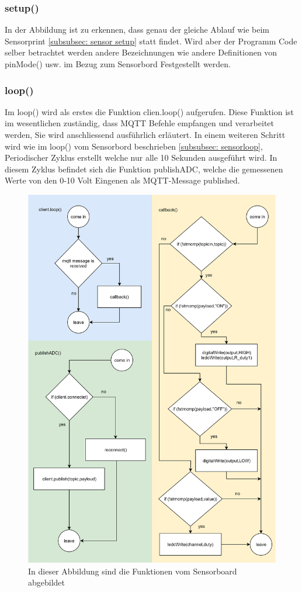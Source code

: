 \subsubsection{setup()}
In der Abbildung ist zu erkennen, dass genau der gleiche Ablauf wie beim Sensorprint \ref{subsubsec: sensor setup} statt findet. Wird aber der Programm Code selber betrachtet werden andere Bezeichnungen wie andere Definitionen von pinMode() usw. im Bezug zum Sensorbord Festgestellt werden. 
\subsubsection{loop()}
Im loop() wird als erstes die Funktion clien.loop() aufgerufen. Diese Funktion ist im wesentlichen zuständig, dass MQTT Befehle empfangen und verarbeitet werden, Sie wird anschliessend ausführlich erläutert. In einem weiteren Schritt wird wie im loop() vom Sensorbord beschrieben \ref{subsubsec: sensorloop}, Periodischer Zyklus erstellt welche nur alle 10 Sekunden ausgeführt wird. In diesem Zyklus befindet sich die Funktion publishADC, welche die gemessenen Werte von den 0-10 Volt Eingenen als MQTT-Message published.
\begin{figure}[H]
	\centering
	\includegraphics[width=\textwidth]{graphics/FunktionenAktor.png}
	\caption{In dieser Abbildung sind die Funktionen vom Sensorboard abgebildet}
	\label{pic: funktionen Aktor}
\end{figure}   
